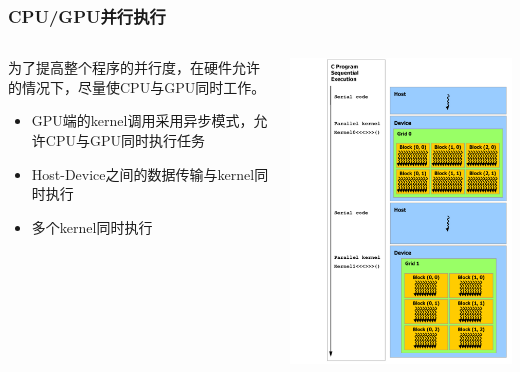 \documentclass{beamer}
\begin{document}
\begin{frame}
  \frametitle{CPU/GPU并行执行}
  \begin{columns}
    \begin{column}{0.5\textwidth}
      为了提高整个程序的并行度，在硬件允许的情况下，尽量使CPU与GPU同时工作。
      \begin{itemize}
        \item GPU端的kernel调用采用异步模式，允许CPU与GPU同时执行任务
        \item Host-Device之间的数据传输与kernel同时执行
        \item 多个kernel同时执行
      \end{itemize}
    \end{column}
    \begin{column}{0.5\textwidth}
      \includegraphics[scale=0.35]{images/heterogeneous-programming.png}
    \end{column}
  \end{columns}
\end{frame}
\end{document}
